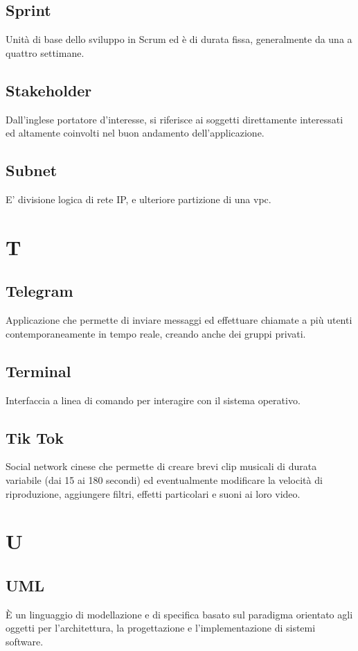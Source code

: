 \documentclass{classes/base}
\begin{document}
        \subsection*{Sprint}
        Unità di base dello sviluppo in Scrum ed è di durata fissa, generalmente da una a quattro settimane.

        \subsection*{Stakeholder} 
        Dall'inglese portatore d'interesse, si riferisce ai soggetti direttamente interessati ed altamente coinvolti nel buon andamento dell'applicazione.
        
        \subsection*{Subnet}
        E' divisione logica di rete IP, e ulteriore partizione di una vpc.
        \newpage  
    \section{T}
        \subsection*{Telegram}
        Applicazione che permette di inviare messaggi ed effettuare chiamate a più utenti contemporaneamente in tempo reale, creando anche dei gruppi privati.

        \subsection*{Terminal} 
        Interfaccia a linea di comando per interagire con il sistema operativo.
        
        \subsection*{Tik Tok}
        Social network cinese che permette di creare brevi clip musicali di durata variabile (dai 15 ai 180 secondi) ed eventualmente modificare la velocità di riproduzione, aggiungere filtri, effetti particolari e suoni ai loro video.
        
        \newpage  
    \section{U}
        \subsection*{UML}
		È un linguaggio di modellazione e di specifica basato sul paradigma orientato agli oggetti per l'architettura, la progettazione e l'implementazione di sistemi software.
\end{document}
